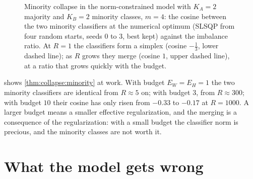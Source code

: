\begin{refsection}
\begin{figure}[t]
\centering
{}
\caption{Minority collapse in the norm-constrained model with $K_A=2$ majority and $K_B=2$ minority classes, $m=4$: the cosine between the two minority classifiers at the numerical optimum (SLSQP from four random starts, seeds $0$ to $3$, best kept) against the imbalance ratio. At $R=1$ the classifiers form a simplex (cosine $-\frac13$, lower dashed line); as $R$ grows they merge (cosine $1$, upper dashed line), at a ratio that grows quickly with the budget.}\label{fig:collapse:minority}
\end{figure}

 shows \cref{thm:collapse:minority} at work. With budget $E_W=E_H=1$ the two minority classifiers are identical from $R\approx5$ on; with budget $3$, from $R\approx300$; with budget $10$ their cosine has only risen from $-0.33$ to $-0.17$ at $R=1000$. A larger budget means a smaller effective regularization, and the merging is a consequence of the regularization: with a small budget the classifier norm is precious, and the minority classes are not worth it.

\section{What the model gets wrong}\label{sec:collapse:wrong}


\end{refsection}
